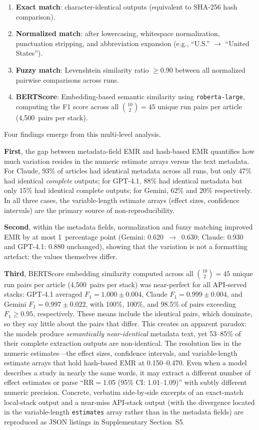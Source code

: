 \documentclass[preprint,review,12pt,authoryear]{elsarticle}
\begin{document}
\begin{enumerate}
  \item \textbf{Exact match}: character-identical outputs (equivalent to SHA-256 hash comparison).
  \item \textbf{Normalized match}: after lowercasing, whitespace normalization, punctuation stripping, and abbreviation expansion (e.g., ``U.S.'' $\to$ ``United States'').
  \item \textbf{Fuzzy match}: Levenshtein similarity ratio $\geq\!0.90$ between all normalized pairwise comparisons across runs.
  \item \textbf{BERTScore}: Embedding-based semantic similarity using \texttt{roberta-large}, computing the F1 score across all $\binom{10}{2}{=}45$ unique run pairs per article (4,500~pairs per stack).
\end{enumerate}


\noindent Four findings emerge from this multi-level analysis.

\textbf{First}, the gap between metadata-field EMR and hash-based EMR quantifies how much variation resides in the numeric estimate arrays versus the text metadata.
For Claude, 93\% of articles had identical metadata across all runs, but only 47\% had identical \emph{complete} outputs; for GPT-4.1, 88\% had identical metadata but only 15\% had identical complete outputs; for Gemini, 62\% and 20\% respectively.
In all three cases, the variable-length estimate arrays (effect sizes, confidence intervals) are the primary source of non-reproducibility.

\textbf{Second}, within the metadata fields, normalization and fuzzy matching improved EMR by at most 1~percentage point (Gemini: 0.620~$\to$~0.630; Claude: 0.930 and GPT-4.1: 0.880 unchanged), showing that the variation is not a formatting artefact: the values themselves differ.

\textbf{Third}, BERTScore embedding similarity computed across all $\binom{10}{2}{=}45$ unique run pairs per article (4,500~pairs per stack) was near-perfect for all API-served stacks: GPT-4.1 averaged $F_1{=}1.000 \pm 0.004$, Claude $F_1{=}0.999 \pm 0.004$, and Gemini $F_1{=}0.997 \pm 0.022$, with 100\%, 100\%, and 98.5\% of pairs exceeding $F_1{\geq}0.95$, respectively. These means include the identical pairs, which dominate, so they say little about the pairs that differ.
This creates an apparent paradox: the models produce \emph{semantically near-identical} metadata text, yet 53--85\% of their complete extraction outputs are non-identical.
The resolution lies in the numeric estimates---the effect sizes, confidence intervals, and variable-length estimate arrays that hold hash-based EMR at 0.150--0.470.
Even when a model describes a study in nearly the same words, it may extract a different number of effect estimates or parse ``RR${=}$1.05 (95\% CI: 1.01--1.09)'' with subtly different numeric precision.
Concrete, verbatim side-by-side excerpts of an exact-match local-stack output and a near-miss API-stack output (with the divergence located in the variable-length \texttt{estimates} array rather than in the metadata fields) are reproduced as JSON listings in Supplementary Section~S5.
\end{document}
